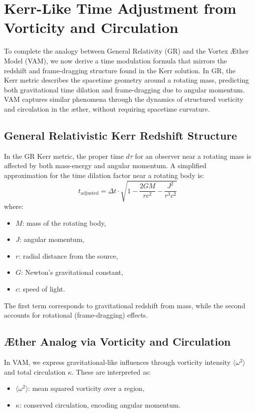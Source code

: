 \section{Kerr-Like Time Adjustment from Vorticity and Circulation}

To complete the analogy between General Relativity (GR) and the Vortex Æther Model (VAM), we now derive a time modulation formula that mirrors the redshift and frame-dragging structure found in the Kerr solution. In GR, the Kerr metric describes the spacetime geometry around a rotating mass, predicting both gravitational time dilation and frame-dragging due to angular momentum. VAM captures similar phenomena through the dynamics of structured vorticity and circulation in the æther, without requiring spacetime curvature.

\subsection{General Relativistic Kerr Redshift Structure}

In the GR Kerr metric, the proper time $d\tau$ for an observer near a rotating mass is affected by both mass-energy and angular momentum. A simplified approximation for the time dilation factor near a rotating body is:
\begin{equation}
    t_{\text{adjusted}} = \Delta t \cdot \sqrt{1 - \frac{2GM}{rc^2} - \frac{J^2}{r^3c^2}}
    \label{eq:Kerr_time_dilation}
\end{equation}
where:
\begin{itemize}
    \item $M$: mass of the rotating body,
    \item $J$: angular momentum,
    \item $r$: radial distance from the source,
    \item $G$: Newton’s gravitational constant,
    \item $c$: speed of light.
\end{itemize}

The first term corresponds to gravitational redshift from mass, while the second accounts for rotational (frame-dragging) effects.

\subsection{Æther Analog via Vorticity and Circulation}

In VAM, we express gravitational-like influences through vorticity intensity $\langle \omega^2 \rangle$ and total circulation $\kappa$. These are interpreted as:
\begin{itemize}
    \item $\langle \omega^2 \rangle$: mean squared vorticity over a region,
    \item $\kappa$: conserved circulation, encoding angular momentum.
\end{itemize}

